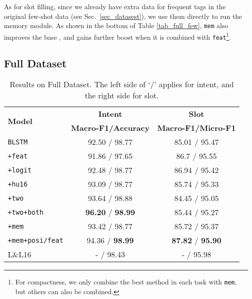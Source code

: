 As for slot filling, since we already have extra data for frequent tags in the original few-shot data (see Sec.~\ref{sec_datasest}), we use
them directly to run the memory module. As shown in the bottom of Table \ref{tab_full_few}, \texttt{mem} also improves the base \BLSTM, and
gains further boost when it is combined with \texttt{feat}\footnote{For compactness, we only combine the best method in each
task with \texttt{mem}, but others can also be combined.}.



\subsection{Full Dataset}

\begin{table}
\setlength{\tabcolsep}{0.23em}
\centering
\small{
\begin{tabular}{|l|c|c|}

\hline
\multirow{2}{*}{\textbf{Model}} & \textbf{Intent} & \textbf{Slot} \\
\cline{2-3}
  & \textbf{\scriptsize Macro-F1/Accuracy} &  \textbf{\scriptsize Macro-F1/Micro-F1} \\
\hline
\rowcolor{Gray} \texttt{BLSTM} & 92.50 / 98.77  & 85.01 / 95.47\\
\hline
\texttt{+feat} & 91.86 / 97.65 & 86.7 / 95.55\\
\hline
\rowcolor{Gray} \texttt{+logit} & 92.48 / 98.77 & 86.94 / 95.42  \\
\hline
\texttt{+hu16} & 93.09 / 98.77 & 85.74 / 95.33  \\
\hline
\rowcolor{Gray} \texttt{+two} & 93.64 / 98.88  & 84.45 / 95.05\\
\hline
\texttt{+two+both }& \textbf{96.20} / \textbf{98.99} & 85.44 / 95.27 \\
\hline
\rowcolor{Gray} \texttt{+mem} & 93.42 / 98.77 & 85.72 / 95.37\\
\hline
\texttt{+mem+posi/feat} & 94.36 / \textbf{98.99} & \textbf{87.82} / \textbf{95.90} \\
\hline
\hline
\rowcolor{Gray} L\&L16 & - / 98.43 & - / 95.98\\
\hline

\end{tabular}
}
\caption{Results on Full Dataset. The left side of `$/$' applies for intent, and the right side for slot.}
\label{tab_full}
\vspace{-1em}
\end{table}

